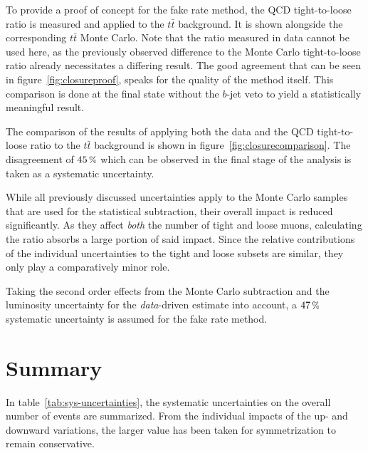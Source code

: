To provide a proof of concept for the fake rate method, the QCD tight-to-loose ratio is measured and applied to the $t\bar{t}$ background. It is shown alongside the corresponding $t\bar{t}$ Monte Carlo. Note that the ratio measured in data cannot be used here, as the previously observed difference to the Monte Carlo tight-to-loose ratio already necessitates a differing result. The good agreement that can be seen in figure~\ref{fig:closureproof}, speaks for the quality of the method itself. This comparison is done at the final state without the $b$-jet veto to yield a statistically meaningful result.

The comparison of the results of applying both the data and the QCD tight-to-loose ratio to the $t\bar{t}$ background is shown in figure~\ref{fig:closurecomparison}. The disagreement of $45\,\pct$ which can be observed in the final stage of the analysis is taken as a systematic uncertainty.

While all previously discussed uncertainties apply to the Monte Carlo samples that are used for the statistical subtraction, their overall impact is reduced significantly. As they affect \textit{both} the number of tight and loose muons, calculating the ratio absorbs a large portion of said impact. Since the relative contributions of the individual uncertainties to the tight and loose subsets are similar, they only play a comparatively minor role.

Taking the second order effects from the Monte Carlo subtraction and the luminosity uncertainty for the \textit{data}-driven estimate into account, a $47\,\pct$ systematic uncertainty is assumed for the fake rate method.


\section{Summary}
\label{sec:summary}

In table~\ref{tab:sys-uncertainties}, the systematic uncertainties on the overall number of events are summarized. From the individual impacts of the up- and downward variations, the larger value has been taken for symmetrization to remain conservative.

